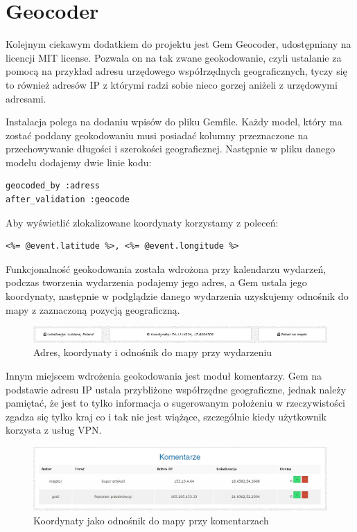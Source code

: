 \documentclass[openright]{xmgr}
\begin{document}
\section{Geocoder}
Kolejnym ciekawym dodatkiem do projektu jest Gem Geocoder\cite{geocoder}, udostępniany na licencji MIT license. Pozwala on na tak zwane geokodowanie, czyli ustalanie za pomocą na przykład adresu  urzędowego współrzędnych geograficznych, tyczy się to również adresów IP z którymi radzi sobie nieco gorzej aniżeli z urzędowymi adresami.

Instalacja polega na dodaniu wpisów do pliku Gemfile. Każdy model, który ma zostać poddany geokodowaniu musi posiadać kolumny przeznaczone na przechowywanie długości i szerokości geograficznej. Następnie w pliku danego modelu dodajemy dwie linie kodu:
\begin{lstlisting}[language=ruby2, caption={Kod odpowiadający za geokodowanie}]
geocoded_by :adress
after_validation :geocode
\end{lstlisting}
Aby wyświetlić zlokalizowane koordynaty korzystamy z poleceń:
\begin{lstlisting}[language=ruby2, caption={Kod wyświetlający koordynaty}]
<%= @event.latitude %>, <%= @event.longitude %>
\end{lstlisting}
Funkcjonalność geokodowania została wdrożona przy kalendarzu wydarzeń, podczas tworzenia wydarzenia podajemy jego adres, a Gem ustala jego koordynaty, następnie w podglądzie danego wydarzenia uzyskujemy odnośnik do mapy z zaznaczoną pozycją geograficzną.

\begin{figure}[!tbh]
\centering
\includegraphics[width=\linewidth]{fig/geocoder-events}
\caption{Adres, koordynaty i odnośnik do mapy przy wydarzeniu}
\end{figure}

Innym miejscem wdrożenia geokodowania jest moduł komentarzy. Gem na podstawie adresu IP ustala przybliżone współrzędne geograficzne, jednak należy pamiętać, że jest to tylko informacja o sugerowanym położeniu w rzeczywistości zgadza się tylko kraj co i tak nie jest wiążące, szczególnie kiedy użytkownik korzysta z usług VPN.

\begin{figure}[!tbh]
\centering
\includegraphics[width=\linewidth]{fig/geocoder-comments}
\caption{Koordynaty jako odnośnik do mapy przy komentarzach}
\end{figure}
\end{document}

